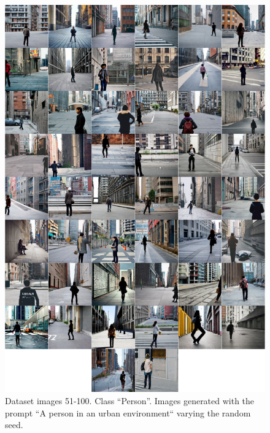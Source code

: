 \begin{figure}
    \centering
    \includegraphics[width=1\columnwidth]{img/6-appendix/dataset_example_person.pdf}
    \caption[Dataset images 51-100]{Dataset images 51-100. Class ``Person''. Images generated with the prompt ``A person in an urban environment`` varying the random seed.}
    \label{fig:dataset-person}
\end{figure}


